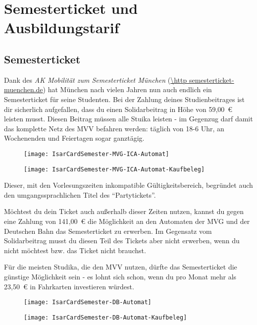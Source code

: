 \chapter{Semesterticket und Ausbildungstarif}

\section{Semesterticket}
Dank des \emph{AK Mobilität zum Semesterticket München} (\url{\http semesterticket-muenchen.de}) hat München nach vielen Jahren nun auch endlich ein Semesterticket für seine Studenten. Bei der Zahlung deines Studienbeitrages ist dir sicherlich aufgefallen, dass du einen Solidarbeitrag in Höhe von 59,00~€ leisten musst. Diesen Beitrag müssen alle Stuika leisten - im Gegenzug darf damit das komplette Netz des MVV befahren werden: täglich von 18-6 Uhr, an Wochenenden und Feiertagen sogar ganztägig.

\begin{figure}[ht]
\centering
\begin{minipage}[b]{0.45\linewidth}
\texttt{[image: IsarCardSemester-MVG-ICA-Automat]}
\end{minipage}
\quad
\begin{minipage}[b]{0.45\linewidth}
\texttt{[image: IsarCardSemester-MVG-ICA-Automat-Kaufbeleg]}
\end{minipage}
\end{figure}

Dieser, mit den Vorlesungszeiten inkompatible Gültigkeitsbereich, begründet auch den umgangssprachlichen Titel des "`Partytickets"'.

Möchtest du dein Ticket auch außerhalb dieser Zeiten nutzen, kannst du gegen eine Zahlung von 141,00~€ die Möglichkeit an den Automaten der MVG und der Deutschen Bahn das Semesterticket zu erwerben. Im Gegensatz vom Solidarbeitrag musst du diesen Teil des Tickets aber nicht erwerben, wenn du nicht möchtest bzw. das Ticket nicht brauchst.

Für die meisten Studika, die den MVV nutzen, dürfte das Semesterticket die günstige Möglichkeit sein - es lohnt sich schon, wenn du pro Monat mehr als 23,50~€ in Fahrkarten investieren würdest.

\begin{figure}[ht]
\centering
\begin{minipage}[b]{0.45\linewidth}
\texttt{[image: IsarCardSemester-DB-Automat]}
\end{minipage}
\quad
\begin{minipage}[b]{0.45\linewidth}
\texttt{[image: IsarCardSemester-DB-Automat-Kaufbeleg]}
\end{minipage}
\end{figure}

